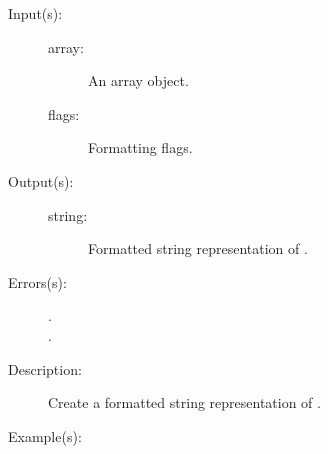 \begin{description}
\label{outputsdict:arraytype}
\item[{\onyxop{array flags}{arraytype}{string}}: ]
	\begin{description}\item[]
	\item[Input(s): ]
		\begin{description}\item[]
		\item[array: ]
			An array object.
		\item[flags: ]
			Formatting flags.
		\end{description}
	\item[Output(s): ]
		\begin{description}\item[]
		\item[string: ]
			Formatted string representation of .
		\end{description}
	\item[Errors(s): ]
		\begin{description}\item[]
		\item[.]
		\item[.]
		\end{description}
	\item[Description: ]
		Create a formatted string representation of .
	\item[Example(s): ]\begin{verbatim}


\end{verbatim}
\end{description}
\end{description}
